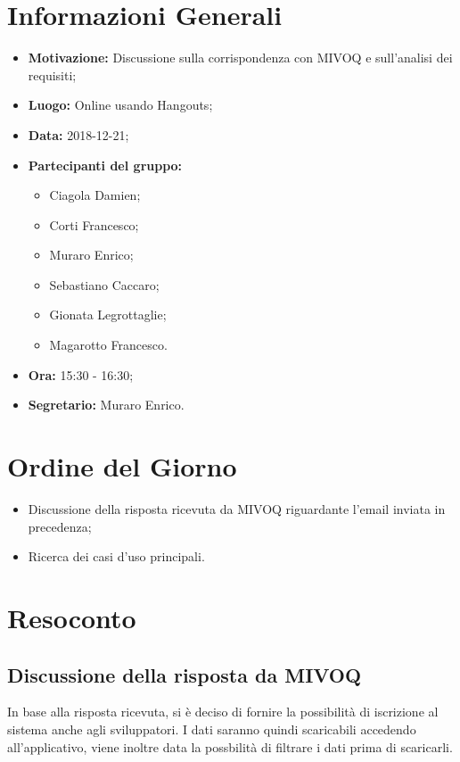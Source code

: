 \documentclass[a4paper, oneside, openany, dvipsnames, table]{article}
\begin{document}
\copertina{}


\newpage
\tableofcontents
\newpage

\section{Informazioni Generali}
\begin{itemize}
\item \textbf{Motivazione:} Discussione sulla corrispondenza con MIVOQ e sull'analisi dei requisiti;
\item \textbf{Luogo:} Online usando Hangouts;
\item \textbf{Data:} 2018-12-21;
\item \textbf{Partecipanti del gruppo:}
	\begin{itemize}
	\item Ciagola Damien;
	\item Corti Francesco;
	\item Muraro Enrico;
	\item Sebastiano Caccaro;
	\item Gionata Legrottaglie;
	\item Magarotto Francesco.
	\end{itemize} 
\item \textbf{Ora:} 15:30 - 16:30;
\item \textbf{Segretario:} Muraro Enrico.
\end{itemize}

\section{Ordine del Giorno}
\begin{itemize}
\item Discussione della risposta ricevuta da MIVOQ riguardante l'email inviata in precedenza;
\item Ricerca dei casi d'uso principali.
\end{itemize}

\section{Resoconto}
\subsection{Discussione della risposta da MIVOQ} In base alla risposta ricevuta, si è deciso di fornire la possibilità di iscrizione al sistema anche agli sviluppatori. I dati saranno quindi scaricabili accedendo all'applicativo, viene inoltre data la possbilità di filtrare i dati prima di scaricarli.
\end{document}
